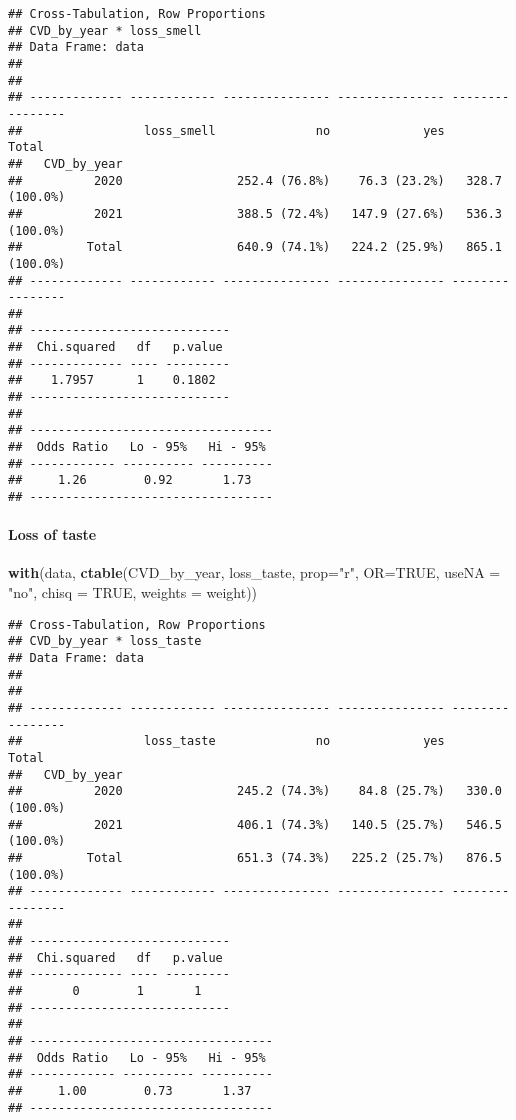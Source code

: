 \documentclass[
]{article}
\newenvironment{Shaded}{\begin{snugshade}}{\end{snugshade}}
\newcommand{\AttributeTok}[1]{\textcolor[rgb]{0.13,0.29,0.53}{#1}}
\newcommand{\ConstantTok}[1]{\textcolor[rgb]{0.56,0.35,0.01}{#1}}
\newcommand{\FunctionTok}[1]{\textcolor[rgb]{0.13,0.29,0.53}{\textbf{#1}}}
\newcommand{\NormalTok}[1]{#1}
\newcommand{\StringTok}[1]{\textcolor[rgb]{0.31,0.60,0.02}{#1}}
\begin{document}
\begin{verbatim}
## Cross-Tabulation, Row Proportions  
## CVD_by_year * loss_smell  
## Data Frame: data  
## 
## 
## ------------- ------------ --------------- --------------- ----------------
##                 loss_smell              no             yes            Total
##   CVD_by_year                                                              
##          2020                252.4 (76.8%)    76.3 (23.2%)   328.7 (100.0%)
##          2021                388.5 (72.4%)   147.9 (27.6%)   536.3 (100.0%)
##         Total                640.9 (74.1%)   224.2 (25.9%)   865.1 (100.0%)
## ------------- ------------ --------------- --------------- ----------------
## 
## ----------------------------
##  Chi.squared   df   p.value 
## ------------- ---- ---------
##    1.7957      1    0.1802  
## ----------------------------
## 
## ----------------------------------
##  Odds Ratio   Lo - 95%   Hi - 95% 
## ------------ ---------- ----------
##     1.26        0.92       1.73   
## ----------------------------------
\end{verbatim}

\hypertarget{loss-of-taste-1}{%
\paragraph{\texorpdfstring{{ Loss of taste
}}{ Loss of taste }}\label{loss-of-taste-1}}

\begin{Shaded}
\begin{Highlighting}[]
\FunctionTok{with}\NormalTok{(data, }\FunctionTok{ctable}\NormalTok{(CVD\_by\_year, loss\_taste, }\AttributeTok{prop=}\StringTok{"r"}\NormalTok{, }\AttributeTok{OR=}\ConstantTok{TRUE}\NormalTok{, }\AttributeTok{useNA =} \StringTok{"no"}\NormalTok{, }\AttributeTok{chisq =} \ConstantTok{TRUE}\NormalTok{, }\AttributeTok{weights =}\NormalTok{ weight))}
\end{Highlighting}
\end{Shaded}

\begin{verbatim}
## Cross-Tabulation, Row Proportions  
## CVD_by_year * loss_taste  
## Data Frame: data  
## 
## 
## ------------- ------------ --------------- --------------- ----------------
##                 loss_taste              no             yes            Total
##   CVD_by_year                                                              
##          2020                245.2 (74.3%)    84.8 (25.7%)   330.0 (100.0%)
##          2021                406.1 (74.3%)   140.5 (25.7%)   546.5 (100.0%)
##         Total                651.3 (74.3%)   225.2 (25.7%)   876.5 (100.0%)
## ------------- ------------ --------------- --------------- ----------------
## 
## ----------------------------
##  Chi.squared   df   p.value 
## ------------- ---- ---------
##       0        1       1    
## ----------------------------
## 
## ----------------------------------
##  Odds Ratio   Lo - 95%   Hi - 95% 
## ------------ ---------- ----------
##     1.00        0.73       1.37   
## ----------------------------------
\end{verbatim}
\end{document}
